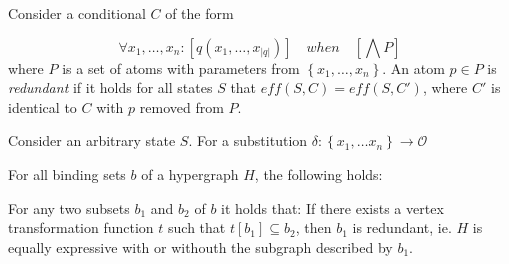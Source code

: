 \documentclass[../Master.tex]{subfiles}
\begin{document}
\begin{definition}
Consider a conditional $C$ of the form

    \begin{equation*}
        \forall x_1, \dots, x_n : [q\left(x_1, \dots, x_{|q|}\right)] \quad when \quad \left[\bigwedge P\right]
    \end{equation*}
    where $P$ is a set of atoms with parameters from $\left\{x_1, \dots, x_n \right\}$.
    An atom $p \in P$ is \emph{redundant} if it holds for all states $S$ that $eff (S, C) = eff \left(S, C'\right)$, where $C'$ is identical to $C$ with $p$ removed from $P$.
\end{definition}

Consider an arbitrary state $S$. For a substitution $\delta : \left\{x_1, \dots x_n \right\} \rightarrow \mathcal{O}$
    
For all binding sets $b$ of a hypergraph $H$, the following holds:

For any two subsets $b_1$ and $b_2$ of $b$ it holds that: If there exists a vertex transformation function $t$ such that $t\left[b_1\right] \subseteq b_2$, then $b_1$ is redundant, ie. $H$ is equally expressive with or withouth the subgraph described by $b_1$.
\end{document}
